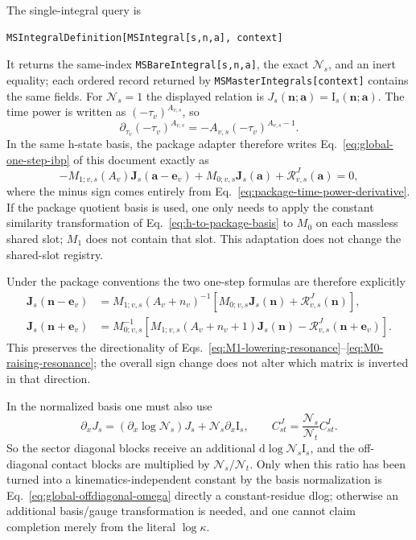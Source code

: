 \documentclass[11pt,a4paper]{article}
\newcommand{\dd}{\mathrm d}
\newcommand{\cR}{\mathcal R}
\newcommand{\cN}{\mathcal N}
\begin{document}
The single-integral query is
\begin{verbatim}
MSIntegralDefinition[MSIntegral[s,n,a], context]
\end{verbatim}
It returns the same-index \texttt{MSBareIntegral[s,n,a]}, the exact $\cN_s$, and an inert equality;
each ordered record returned by \texttt{MSMasterIntegrals[context]} contains the same fields.
For $\cN_s=1$ the displayed relation is $J_s(\bm n;\bm a)=\text{I}_s(\bm n;\bm a)$.
The time power is written as $(-\tau_v)^{A_{v,s}}$, so
\begin{equation}
 \partial_{\tau_v}(-\tau_v)^{A_{v,s}}
 =-A_{v,s}(-\tau_v)^{A_{v,s}-1}.
 \label{eq:package-time-power-derivative}
\end{equation}
In the same h-state basis, the package adapter therefore writes Eq.~\eqref{eq:global-one-step-ibp} of this document exactly as
\begin{equation}
 -M_{1;v,s}(A_v)\bm J_s(\bm a-\bm e_v)
 +M_{0;v,s}\bm J_s(\bm a)
 +\cR^{J}_{v,s}(\bm a)=0,
 \label{eq:package-one-step-ibp}
\end{equation}
where the minus sign comes entirely from Eq.~\eqref{eq:package-time-power-derivative}. If the package quotient basis is used, one only needs to apply the constant similarity transformation of Eq.~\eqref{eq:h-to-package-basis} to $M_0$ on each massless shared slot; $M_1$ does not contain that slot. This adaptation does not change the shared-slot registry.

Under the package conventions the two one-step formulas are therefore explicitly
\begin{align}
 \bm J_s(\bm n-\bm e_v)
 &=M_{1;v,s}(A_v+n_v)^{-1}
 \left[M_{0;v,s}\bm J_s(\bm n)+\cR^J_{v,s}(\bm n)\right],
 \label{eq:package-lowering}\\
 \bm J_s(\bm n+\bm e_v)
 &=M_{0;v,s}^{-1}
 \left[M_{1;v,s}(A_v+n_v+1)\bm J_s(\bm n)
 -\cR^J_{v,s}(\bm n+\bm e_v)\right].
 \label{eq:package-raising}
\end{align}
This preserves the directionality of Eqs.~\eqref{eq:M1-lowering-resonance}--\eqref{eq:M0-raising-resonance}; the overall sign change does not alter which matrix is inverted in that direction.

In the normalized basis one must also use
\begin{equation}
 \partial_xJ_s
 =(\partial_x\log\cN_s)J_s+\cN_s\partial_x\text{I}_s,
 \qquad
 C^{J}_{st}=\frac{\cN_s}{\cN_t}C^{I}_{st}.
 \label{eq:normalization-adapter}
\end{equation}
So the sector diagonal blocks receive an additional $\dd\log\cN_s\text{I}_s$, and the off-diagonal contact blocks are multiplied by $\cN_s/\cN_t$. Only when this ratio has been turned into a kinematics-independent constant by the basis normalization is Eq.~\eqref{eq:global-offdiagonal-omega} directly a constant-residue dlog; otherwise an additional basis/gauge transformation is needed, and one cannot claim completion merely from the literal $\log\kappa$.
\end{document}

